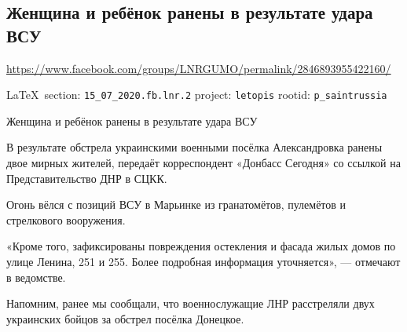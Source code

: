  
 

\subsection{Женщина и ребёнок ранены в результате удара ВСУ}
\url{https://www.facebook.com/groups/LNRGUMO/permalink/2846893955422160/}

\label{sec:15_07_2020.fb.lnr.2}
\cite{15_07_2020.fb.lnr.2}
  
\vspace{0.5cm}
{\ifDEBUG\small\LaTeX~section: \verb|15_07_2020.fb.lnr.2| project: \verb|letopis| rootid: \verb|p_saintrussia|\fi
}
\vspace{0.5cm}

Женщина и ребёнок ранены в результате удара ВСУ

В результате обстрела украинскими военными посёлка Александровка ранены двое
мирных жителей, передаёт корреспондент «Донбасс Сегодня» со ссылкой на
Представительство ДНР в СЦКК.

Огонь вёлся с позиций ВСУ в Марьинке из гранатомётов, пулемётов и стрелкового
вооружения.

«Кроме того, зафиксированы повреждения остекления и фасада жилых домов по улице
Ленина, 251 и 255. Более подробная информация уточняется», --- отмечают в
ведомстве.

Напомним, ранее мы сообщали, что военнослужащие ЛНР расстреляли двух украинских
бойцов за обстрел посёлка Донецкое.
  
